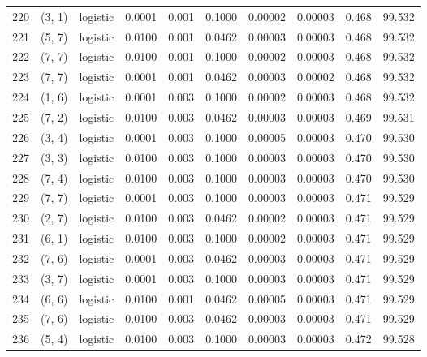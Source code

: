 \begin{tabular}{lllrrrrrrr}
220 &      (3, 1) &  logistic &  0.0001 &  0.001 &  0.1000 &          0.00002 &    0.00003 &       0.468 &    99.532 \\
221 &      (5, 7) &  logistic &  0.0100 &  0.001 &  0.0462 &          0.00003 &    0.00003 &       0.468 &    99.532 \\
222 &      (7, 7) &  logistic &  0.0100 &  0.001 &  0.1000 &          0.00002 &    0.00003 &       0.468 &    99.532 \\
223 &      (7, 7) &  logistic &  0.0001 &  0.001 &  0.0462 &          0.00003 &    0.00002 &       0.468 &    99.532 \\
224 &      (1, 6) &  logistic &  0.0001 &  0.003 &  0.1000 &          0.00002 &    0.00003 &       0.468 &    99.532 \\
225 &      (7, 2) &  logistic &  0.0100 &  0.003 &  0.0462 &          0.00003 &    0.00003 &       0.469 &    99.531 \\
226 &      (3, 4) &  logistic &  0.0001 &  0.003 &  0.1000 &          0.00005 &    0.00003 &       0.470 &    99.530 \\
227 &      (3, 3) &  logistic &  0.0100 &  0.003 &  0.1000 &          0.00003 &    0.00003 &       0.470 &    99.530 \\
228 &      (7, 4) &  logistic &  0.0100 &  0.003 &  0.1000 &          0.00003 &    0.00003 &       0.470 &    99.530 \\
229 &      (7, 7) &  logistic &  0.0001 &  0.003 &  0.1000 &          0.00003 &    0.00003 &       0.471 &    99.529 \\
230 &      (2, 7) &  logistic &  0.0100 &  0.003 &  0.0462 &          0.00002 &    0.00003 &       0.471 &    99.529 \\
231 &      (6, 1) &  logistic &  0.0100 &  0.003 &  0.1000 &          0.00002 &    0.00003 &       0.471 &    99.529 \\
232 &      (7, 6) &  logistic &  0.0001 &  0.003 &  0.0462 &          0.00003 &    0.00003 &       0.471 &    99.529 \\
233 &      (3, 7) &  logistic &  0.0001 &  0.003 &  0.1000 &          0.00003 &    0.00003 &       0.471 &    99.529 \\
234 &      (6, 6) &  logistic &  0.0100 &  0.001 &  0.0462 &          0.00005 &    0.00003 &       0.471 &    99.529 \\
235 &      (7, 6) &  logistic &  0.0100 &  0.003 &  0.0462 &          0.00003 &    0.00003 &       0.471 &    99.529 \\
236 &      (5, 4) &  logistic &  0.0100 &  0.003 &  0.1000 &          0.00003 &    0.00003 &       0.472 &    99.528 \\

\end{tabular}

